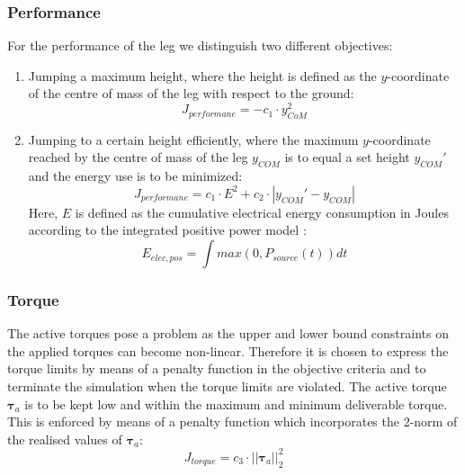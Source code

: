 \documentclass[letterpaper, 10 pt, conference]{ieeeconf}  %
\begin{document}
\subsubsection{Performance}
For the performance of the leg we distinguish two different objectives: 
\begin{enumerate}
	\item Jumping a maximum height, where the height is defined as the $y$-coordinate of the centre of mass of the leg with respect to the ground:
 \begin{equation}
	J_{performane} = -c_1 \cdot y_{CoM}^2
 \end{equation}
	\item Jumping to a certain height efficiently, where the maximum $y$-coordinate reached by the centre of mass of the leg $y_{COM}$ is to equal a set height $y_{COM}'$ and the energy use is to be minimized:
 \begin{equation}
	J_{performane} =  c_1 \cdot E^2 + c_2 \cdot |y_{COM}'-y_{COM}|
 \end{equation}
	Here, $E$ is defined as the cumulative electrical energy consumption in Joules according to the integrated positive power model \cite{verstraten2016energy}:
	 \begin{equation}
	E_{elec,pos} = \int max(0,P_{source}(t))dt
	\end{equation}
\end{enumerate}

\subsubsection{Torque}
The active torques pose a problem as the upper and lower bound constraints on the applied torques can become non-linear. Therefore it is chosen to express the torque limits by means of a penalty function in the objective criteria and to terminate the simulation when the torque limits are violated.
The active torque $\boldsymbol{\tau}_a$ is to be kept low and within the maximum and minimum deliverable torque. This is enforced by means of a penalty function which incorporates the 2-norm of the realised values of $\boldsymbol{\tau}_a$:  
 \begin{equation}
J_{torque}= c_3 \cdot || \boldsymbol{\tau}_a ||_2^2
 \end{equation}
\end{document}
